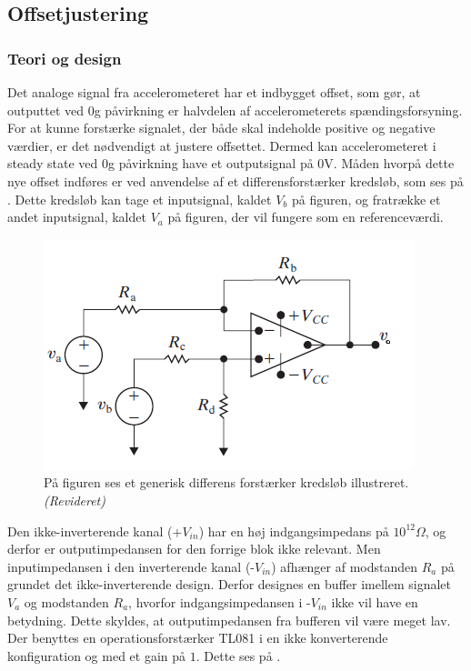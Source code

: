 \subsection{Offsetjustering}
\subsubsection{Teori og design} \label{Offset_Teori_Design}
Det analoge signal fra accelerometeret har et indbygget offset, som gør, at outputtet ved $0$g påvirkning er halvdelen af accelerometerets spændingsforsyning. For at kunne forstærke signalet, der både skal indeholde positive og negative værdier, er det nødvendigt at justere offsettet. Dermed kan accelerometeret i steady state ved $0$g påvirkning have et outputsignal på $0$V. Måden hvorpå dette nye offset indføres er ved anvendelse af et differensforstærker kredsløb, som ses på . Dette kredsløb kan tage et inputsignal, kaldet $V_{b}$ på figuren, og fratrække et andet inputsignal, kaldet $V_{a}$ på figuren, der vil fungere som en referenceværdi.
\begin{figure}[H]
\centering
\includegraphics[scale=1.3]{figures/cProblemloesning/Differensforstaerker_generisk.png}
\caption{På figuren ses et generisk differens forstærker kredsløb illustreret.\textit{(Revideret)} \cite{Nilsson2011}}
\label{fig:Differensforstaerker_generisk}
\end{figure}
Den ikke-inverterende kanal ($+V_{in}$) har en høj indgangsimpedans på $10^{12}\Omega$, og derfor er outputimpedansen for den forrige blok ikke relevant. \cite{Corporation1995} Men inputimpedansen i den inverterende kanal (-$V_{in}$) afhænger af modstanden $R_{a}$ på  grundet det ikke-inverterende design. Derfor designes en buffer imellem signalet $V_{a}$ og modstanden $R_{a}$, hvorfor indgangsimpedansen i -$V_{in}$ ikke vil have en betydning. Dette skyldes, at outputimpedansen fra bufferen vil være meget lav. Der benyttes en operationsforstærker TL081 i en ikke konverterende konfiguration og med et gain på $1$. Dette ses på . 
